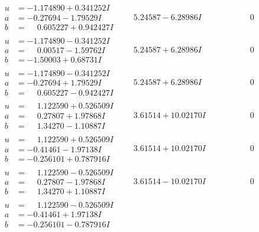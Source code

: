 \documentclass[1p]{elsarticle_modified}
\theoremstyle{definition}
\begin{document}
$$\begin{array}{c|c|c}
\begin{aligned}
u &= -1.174890 + 0.341252 I \\
a &= -0.27694 - 1.79529 I \\
b &= \phantom{-}0.605227 + 0.942427 I\end{aligned}
 & \phantom{-}5.24587 - 6.28986 I & \phantom{-0.000000 } 0 \\ \hline\begin{aligned}
u &= -1.174890 - 0.341252 I \\
a &= \phantom{-}0.00517 - 1.59762 I \\
b &= -1.50003 + 0.68731 I\end{aligned}
 & \phantom{-}5.24587 + 6.28986 I & \phantom{-0.000000 } 0 \\ \hline\begin{aligned}
u &= -1.174890 - 0.341252 I \\
a &= -0.27694 + 1.79529 I \\
b &= \phantom{-}0.605227 - 0.942427 I\end{aligned}
 & \phantom{-}5.24587 + 6.28986 I & \phantom{-0.000000 } 0 \\ \hline\begin{aligned}
u &= \phantom{-}1.122590 + 0.526509 I \\
a &= \phantom{-}0.27807 + 1.97868 I \\
b &= \phantom{-}1.34270 - 1.10887 I\end{aligned}
 & \phantom{-}3.61514 + 10.02170 I & \phantom{-0.000000 } 0 \\ \hline\begin{aligned}
u &= \phantom{-}1.122590 + 0.526509 I \\
a &= -0.41461 - 1.97138 I \\
b &= -0.256101 + 0.787916 I\end{aligned}
 & \phantom{-}3.61514 + 10.02170 I & \phantom{-0.000000 } 0 \\ \hline\begin{aligned}
u &= \phantom{-}1.122590 - 0.526509 I \\
a &= \phantom{-}0.27807 - 1.97868 I \\
b &= \phantom{-}1.34270 + 1.10887 I\end{aligned}
 & \phantom{-}3.61514 - 10.02170 I & \phantom{-0.000000 } 0 \\ \hline\begin{aligned}
u &= \phantom{-}1.122590 - 0.526509 I \\
a &= -0.41461 + 1.97138 I \\
b &= -0.256101 - 0.787916 I\end{aligned}

\end{array}$$
\end{document}

